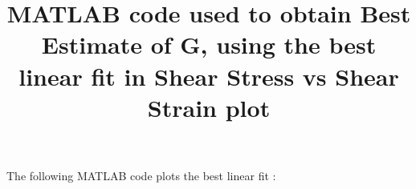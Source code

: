 \documentclass[12pt,a4paper]{article}	%
\title{MATLAB code used to obtain Best Estimate of G, using the best linear fit in Shear Stress vs Shear Strain plot}
\date{\vspace{-5ex}}	%
\begin{document}
\maketitle
\thispagestyle{empty}	%

The following MATLAB code plots the best linear fit  :


\bigbreak 
\bigbreak 

\thispagestyle{empty}	%
\end{document}
